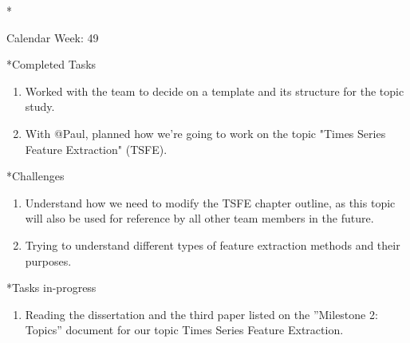 \documentclass[11pt,a4paper]{article}
\begin{document}
\newpage
\begin{section}*{Calendar Week: 49 \hfill \date{04 December, 2020}}
 \begin{refsection}
     \begin{subsection}*{Completed Tasks}
         \begin{enumerate}
             \item
                   Worked with the team to decide on a template and its structure for the topic study.
             \item
                   With @Paul, planned how we're going to work on the topic "Times Series Feature Extraction" (TSFE).
         \end{enumerate}
     \end{subsection}

     \begin{subsection}*{Challenges}
         \begin{enumerate}
             \item
                   Understand how we need to modify the TSFE chapter outline, as this topic will also be used for reference by all other team members in the future.
             \item
                   Trying to understand different types of feature extraction methods and their purposes.
         \end{enumerate}
     \end{subsection}

     \begin{subsection}*{Tasks in-progress}
         \begin{enumerate}
             \item
                   Reading the dissertation \cite{DBLP:phd/dnb/Kimotho16} and the third paper \cite{DBLP:journals/corr/abs-1709-01073} listed on the ”Milestone 2: Topics” document for our topic Times Series Feature Extraction.
         \end{enumerate}
     \end{subsection}

     \printbibliography
 \end{refsection}
\end{section}
\end{document}
